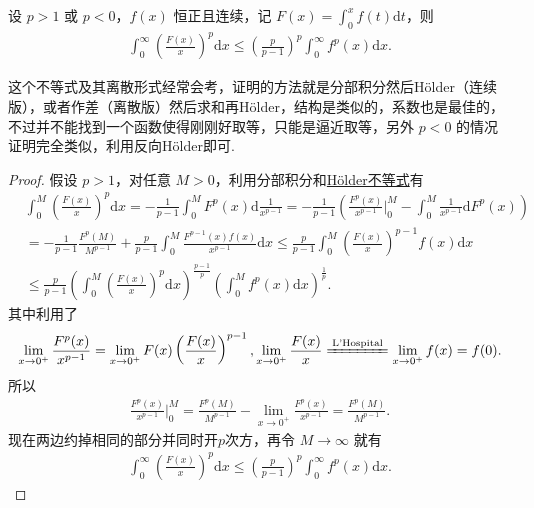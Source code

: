 \documentclass[../../main.tex]{subfiles}
\begin{document}
\begin{theorem}[Hardy不等式]\label{theorem:Hardy(哈代)不等式}
设 $p > 1$ 或 $p < 0$，$f(x)$ 恒正且连续，记 $F(x) = \int_0^x f(t) \mathrm{d}t$，则
\begin{align*}
\int_0^\infty \left( \frac{F(x)}{x} \right)^p \mathrm{d}x \leqslant \left( \frac{p}{p - 1} \right)^p \int_0^\infty f^p(x) \mathrm{d}x.
\end{align*}
\end{theorem}
\begin{remark}
这个不等式及其离散形式经常会考，证明的方法就是分部积分然后Hölder（连续版），或者作差（离散版）然后求和再Hölder，结构是类似的，系数也是最佳的，不过并不能找到一个函数使得刚刚好取等，只能是逼近取等，另外 $p < 0$ 的情况证明完全类似，利用反向Hölder即可.
\end{remark}
\begin{proof}
假设 $p > 1$，对任意 $M > 0$，利用分部积分和\hyperref[theorem:Hölder(赫尔德)不等式(积分形式)]{Hölder不等式}有
\begin{align*}
&\int_0^M \left( \frac{F(x)}{x} \right)^p \mathrm{d}x = -\frac{1}{p - 1} \int_0^M F^p(x) \mathrm{d}\frac{1}{x^{p - 1}} = -\frac{1}{p - 1} \left( \frac{F^p(x)}{x^{p - 1}} \bigg|_0^M - \int_0^M \frac{1}{x^{p - 1}} \mathrm{d}F^p(x) \right)
\\
&= -\frac{1}{p - 1} \frac{F^p(M)}{M^{p - 1}} + \frac{p}{p - 1} \int_0^M \frac{F^{p - 1}(x) f(x)}{x^{p - 1}} \mathrm{d}x \leqslant \frac{p}{p - 1} \int_0^M \left( \frac{F(x)}{x} \right)^{p - 1} f(x) \mathrm{d}x
\\
&\leqslant \frac{p}{p - 1} \left( \int_0^M \left( \frac{F(x)}{x} \right)^p \mathrm{d}x \right)^{\frac{p - 1}{p}} \left( \int_0^M f^p(x) \mathrm{d}x \right)^{\frac{1}{p}}.
\end{align*}
其中利用了
\begin{align*}
\lim_{x \to 0^+} \frac{F^p(x)}{x^{p - 1}} = \lim_{x \to 0^+} F(x) \left( \frac{F(x)}{x} \right)^{p - 1}, \lim_{x \to 0^+} \frac{F(x)}{x} \xlongequal{\text{L'Hospital}} \lim_{x \to 0^+} f(x) = f(0).
\end{align*}
所以
\begin{align*}
\frac{F^p(x)}{x^{p - 1}} \bigg|_0^M = \frac{F^p(M)}{M^{p - 1}} - \lim_{x \to 0^+} \frac{F^p(x)}{x^{p - 1}} = \frac{F^p(M)}{M^{p - 1}}.
\end{align*}
现在两边约掉相同的部分并同时开$p$次方，再令 $M \to \infty$ 就有
\begin{align*}
\int_0^\infty \left( \frac{F(x)}{x} \right)^p \mathrm{d}x \leqslant \left( \frac{p}{p - 1} \right)^p \int_0^\infty f^p(x) \mathrm{d}x.
\end{align*}

\end{proof}
\end{document}
